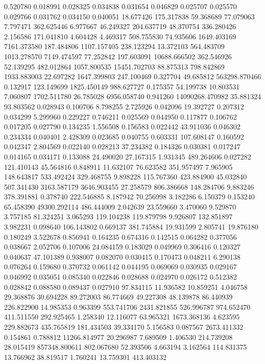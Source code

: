 0.520780
0.018991
0.028325
0.034838
0.031654
0.046829
0.025707
0.025570
0.029766
0.031762
0.034150
0.040051
18.677426
175.317838
59.368689
77.079063
7.797471
362.625446
6.977667
46.249327
204.637719
48.370754
336.280426
2.156586
171.041810
4.604428
4.469317
508.755830
74.935606
1649.403169
7161.373580
187.484806
1107.157405
238.123294
13.372103
564.483709
1013.278570
7149.474597
77.252842
197.603091
10688.666502
362.546926
52.139295
482.012864
1057.800535
15451.702703
88.875313
798.842869
1933.883003
22.697282
1647.399803
247.100469
0.327704
49.685812
563298.870466
0.132917
123.149699
1825.450149
988.627727
0.175357
54.199738
10.803531
7.060807
1702.511780
26.785028
6956.058740
0.941260
14090268.470982
35.881324
93.803562
0.028943
0.100706
8.798255
2.725926
0.042096
19.392727
0.207312
0.034299
5.299960
0.229227
0.746211
0.025569
0.044950
0.117877
0.106762
0.017205
0.027790
0.134235
1.556508
0.156583
0.022442
43.911036
0.046302
0.234334
0.040401
2.428309
0.023685
0.040755
0.603331
107.608147
0.160592
0.042347
2.804569
0.022140
0.028213
37.234382
0.184326
0.030381
0.017247
0.014165
0.034171
0.133088
24.490020
27.167315
1.931345
489.264606
0.027282
121.410143
45.564816
0.848911
11.632107
76.623582
351.957497
7.965905
148.643817
533.492424
329.468755
9.898228
115.767360
423.884900
45.032840
507.341430
3163.587179
3646.903455
27.258579
806.386668
148.284706
9.883246
378.391881
0.378740
222.546885
8.187942
70.256998
3.182286
6.150379
0.153240
65.458390
49300.292114
486.444009
2.042639
23.559660
3.470060
9.529870
3.757185
81.324251
3.065293
119.104238
119.879798
9.926807
132.851897
3.982231
0.098640
106.143802
0.669137
381.745884
19.931599
2.805741
19.876180
0.180249
3.522678
0.856941
0.164235
0.674316
0.142515
0.064282
0.377056
0.038667
2.052706
0.107006
24.084159
0.183029
0.049969
0.306416
0.120327
0.040637
47.101389
0.938007
0.082070
0.030415
0.170473
0.048211
6.290138
0.076264
0.159680
0.370732
0.061142
0.044195
0.069069
0.030935
0.029167
0.046992
0.035051
0.085340
0.022846
0.028688
0.024970
0.026172
0.512382
0.028842
0.088580
0.089437
0.027910
97.834115
11.936582
10.859251
4.046758
29.368876
30.694228
89.272003
86.774669
49.227308
48.139878
86.440939
226.822900
14.985353
0.963399
553.741706
2431.821855
526.996787
974.652470
411.511550
292.925465
1.258340
12.116077
63.965321
1673.368136
4.623595
229.882673
435.765819
181.434503
39.334170
5.156583
0.087567
2673.411332
0.154861
0.788812
11266.814977
20.296987
7.689509
1.406530
214.739208
28.015419
857348.800611
802.067680
52.393506
4.663194
3.162564
114.831375
13.766962
38.819517
1.760241
13.759301
413.403132
